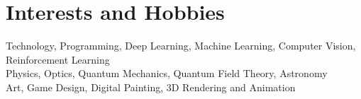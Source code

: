 \section{Interests and Hobbies}

Technology, Programming, Deep Learning, Machine Learning, Computer Vision, Reinforcement Learning \\
Physics, Optics, Quantum Mechanics, Quantum Field Theory, Astronomy \\
Art, Game Design, Digital Painting, 3D Rendering and Animation